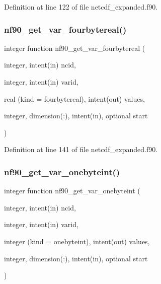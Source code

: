 Definition at line 122 of file netcdf\+\_\+expanded.\+f90.

\mbox{\label{netcdf__expanded_8f90_a0fb4405d7b5e49f2333a0c45151d59aa}} 
\subsubsection{\texorpdfstring{nf90\+\_\+get\+\_\+var\+\_\+fourbytereal()}{nf90\_get\_var\_fourbytereal()}}
{\footnotesize\ttfamily integer function nf90\+\_\+get\+\_\+var\+\_\+fourbytereal (\begin{DoxyParamCaption}\item[{integer, intent(in)}]{ncid,  }\item[{integer, intent(in)}]{varid,  }\item[{real (kind = fourbytereal), intent(out)}]{values,  }\item[{integer, dimension(\+:), intent(in), optional}]{start }\end{DoxyParamCaption})}



Definition at line 141 of file netcdf\+\_\+expanded.\+f90.

\mbox{\label{netcdf__expanded_8f90_ab84f26faf47ece5b6f01e87952a3e366}} 
\subsubsection{\texorpdfstring{nf90\+\_\+get\+\_\+var\+\_\+onebyteint()}{nf90\_get\_var\_onebyteint()}}
{\footnotesize\ttfamily integer function nf90\+\_\+get\+\_\+var\+\_\+onebyteint (\begin{DoxyParamCaption}\item[{integer, intent(in)}]{ncid,  }\item[{integer, intent(in)}]{varid,  }\item[{integer (kind = onebyteint), intent(out)}]{values,  }\item[{integer, dimension(\+:), intent(in), optional}]{start }\end{DoxyParamCaption})}



